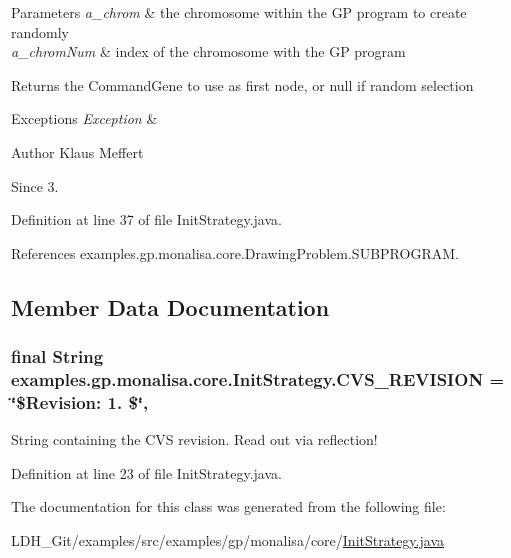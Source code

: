 \begin{DoxyParams}{Parameters}
{\em a\-\_\-chrom} & the chromosome within the G\-P program to create randomly \\
\hline
{\em a\-\_\-chrom\-Num} & index of the chromosome with the G\-P program \\
\hline
\end{DoxyParams}
\begin{DoxyReturn}{Returns}
the Command\-Gene to use as first node, or null if random selection 
\end{DoxyReturn}

\begin{DoxyExceptions}{Exceptions}
{\em Exception} & \\
\hline
\end{DoxyExceptions}
\begin{DoxyAuthor}{Author}
Klaus Meffert 
\end{DoxyAuthor}
\begin{DoxySince}{Since}
3. 
\end{DoxySince}


Definition at line 37 of file Init\-Strategy.\-java.



References examples.\-gp.\-monalisa.\-core.\-Drawing\-Problem.\-S\-U\-B\-P\-R\-O\-G\-R\-A\-M.



\subsection{Member Data Documentation}
\hypertarget{classexamples_1_1gp_1_1monalisa_1_1core_1_1_init_strategy_ad8d8a770dbc398952df5cf0529d12af5}{
\subsubsection[{C\-V\-S\-\_\-\-R\-E\-V\-I\-S\-I\-O\-N}]{\setlength{\rightskip}{0pt plus 5cm}final String examples.\-gp.\-monalisa.\-core.\-Init\-Strategy.\-C\-V\-S\-\_\-\-R\-E\-V\-I\-S\-I\-O\-N = \char`\"{}\$Revision\-: 1. \$\char`\"{}\hspace{0.3cm}{\ttfamily [static]}, {\ttfamily [private]}}}\label{classexamples_1_1gp_1_1monalisa_1_1core_1_1_init_strategy_ad8d8a770dbc398952df5cf0529d12af5}
String containing the C\-V\-S revision. Read out via reflection! 

Definition at line 23 of file Init\-Strategy.\-java.



The documentation for this class was generated from the following file\-:\begin{DoxyCompactItemize}
\item 
L\-D\-H\-\_\-\-Git/examples/src/examples/gp/monalisa/core/\hyperlink{monalisa_2core_2_init_strategy_8java}{Init\-Strategy.\-java}\end{DoxyCompactItemize}
